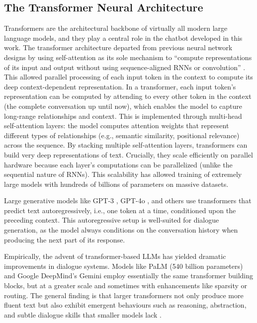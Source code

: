 \subsection*{The Transformer Neural Architecture}
\label{ssec:transformers} 
Transformers are the architectural backbone of virtually all modern large language models, and they play a central role in the chatbot developed in this work. The transformer architecture \cite{vaswani2017attention} departed from previous neural network designs by using self-attention as its sole mechanism to ``compute representations of its input and output without using sequence-aligned RNNs or convolution'' \cite{vaswani2017attention}. This allowed parallel processing of each input token in the context to compute its deep context-dependent representation. In a transformer, each input token's representation can be computed by attending to every other token in the context (the complete conversation up until now), which enables the model to capture long-range relationships and context. This is implemented through multi-head self-attention layers: the model computes attention weights that represent different types of relationships (e.g., semantic similarity, positional relevance) across the sequence. By stacking multiple self-attention layers, transformers can build very deep representations of text. Crucially, they scale efficiently on parallel hardware because each layer's computations can be parallelized (unlike the sequential nature of RNNs). This scalability has allowed training of extremely large models with hundreds of billions of parameters on massive datasets.


Large generative models like GPT-3 \cite{brown2020language}, GPT-4o \cite{openai2023gpt4}, and others use transformers that predict text autoregressively, i.e., one token at a time, conditioned upon the preceding context. This autoregressive setup is well-suited for dialogue generation, as the model always conditions on the conversation history when producing the next part of its response.


Empirically, the advent of transformer-based LLMs has yielded dramatic improvements in dialogue systems. Models like PaLM \cite{chowdhery2022palm} (540 billion parameters) and Google DeepMind's Gemini \cite{geminiteam2025geminifamilyhighlycapable} employ essentially the same transformer building blocks, but at a greater scale and sometimes with enhancements like sparsity or routing. The general finding is that larger transformers not only produce more fluent text but also exhibit emergent behaviours such as reasoning, abstraction, and subtle dialogue skills that smaller models lack \cite{52065,berti2025emergentabilitieslargelanguage}.


